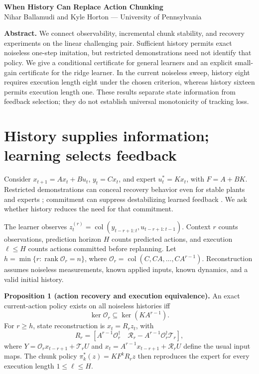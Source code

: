 \documentclass[11pt]{article}
\begin{document}
\begin{center}
{\Large\bfseries When History Can Replace Action Chunking}\\[5pt]
Nihar Ballamudi and Kyle Horton --- University of Pennsylvania
\end{center}
\noindent\textbf{Abstract.}
We connect observability, incremental chunk stability, and recovery experiments on the linear challenging pair. Sufficient history permits exact noiseless one-step imitation, but restricted demonstrations need not identify that policy. We give a conditional certificate for general learners and an explicit small-gain certificate for the ridge learner. In the current noiseless sweep, history eight requires execution length eight under the chosen criterion, whereas history sixteen permits execution length one. These results separate state information from feedback selection; they do not establish universal monotonicity of tracking loss.

\section{History supplies information; learning selects feedback}
Consider $x_{t+1}=Ax_t+Bu_t$, $y_t=Cx_t$, and expert $u_t^*=Kx_t$, with $F=A+BK$. Restricted demonstrations can conceal recovery behavior even for stable plants and experts \citep{simchowitz2025}; commitment can suppress destabilizing learned feedback \citep{zhang2025}. We ask whether history reduces the need for that commitment.

The learner observes $z_t^{(r)}=\operatorname{col}(y_{t-r+1:t},u_{t-r+1:t-1})$. Context $r$ counts observations, prediction horizon $H$ counts predicted actions, and execution $\ell\le H$ counts actions committed before replanning. Let $h=\min\{r:\operatorname{rank}\mathcal O_r=n\}$, where $\mathcal O_r=\operatorname{col}(C,CA,\ldots,CA^{r-1})$. Reconstruction assumes noiseless measurements, known applied inputs, known dynamics, and a valid initial history.

\noindent\textbf{Proposition 1 (action recovery and execution equivalence).}
An exact current-action policy exists on all noiseless histories iff
\[
\ker\mathcal O_r\subseteq\ker(KA^{r-1}).
\]
For $r\ge h$, state reconstruction is $x_t=R_rz_t$, with
\[
R_r=[A^{r-1}\mathcal O_r^\dagger\quad
\mathcal R_r-A^{r-1}\mathcal O_r^\dagger\mathcal T_r],
\]
where $Y=\mathcal O_rx_{t-r+1}+\mathcal T_rU$ and
$x_t=A^{r-1}x_{t-r+1}+\mathcal R_rU$ define the usual input maps.
The chunk policy $\pi_k^*(z)=KF^kR_rz$ then reproduces the expert for every execution length $1\le\ell\le H$.
\end{document}
